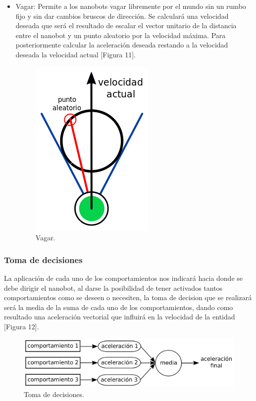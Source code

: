 \begin{itemize}
 \item Vagar: Permite a los nanobots vagar libremente por el mundo sin un rumbo fijo y sin dar cambios bruscos de dirección. Se calculará una velocidad deseada que será el resultado de escalar el vector unitario de la distancia entre el nanobot y  un punto aleatorio  por la velocidad máxima. Para posteriormente calcular la aceleración deseada restando a la velocidad deseada la velocidad actual [Figura 11].  

  \begin{figure}[h]
 \centering
 \includegraphics[scale=0.4]{../images/wander.png}
 \caption{Vagar.}
 \label{fig:../images/wander.png}
 \end{figure}
 
 \end{itemize}


\subsubsection{Toma de decisiones}
\label{sec:toma_decisiones}
La aplicación de cada uno de los comportamientos nos indicará hacia donde se debe dirigir el nanobot, al darse la posibilidad de tener activados tantos comportamientos como se deseen o necesiten, la toma de decision que se realizará será la media de la suma de cada uno de los comportamientos, dando como resultado una aceleración vectorial que influirá en la velocidad de la entidad [Figura 12].

 \begin{figure}[h]
 \centering
 \includegraphics[scale=0.3]{../images/toma_decisiones.png}
 \caption{Toma de decisiones.}
 \label{fig:../images/toma_decisiones.png}
 \end{figure}


